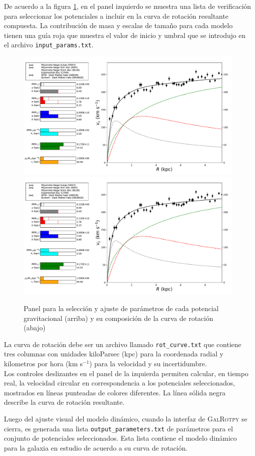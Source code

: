 De acuerdo a la figura \ref{fig:GUI1}, en el panel izquierdo se muestra una lista de verificación para seleccionar los potenciales a incluir en la curva de rotación resultante compuesta. La contribución de masa y escalas de tamaño para cada modelo tienen una guía roja que muestra el valor de inicio y umbral que se introdujo en  el archivo \verb+input_params.txt+.

\begin{figure}
  \centering
    \includegraphics[trim=0cm 0cm 22cm 0cm,clip=true, width=0.4\columnwidth]{Kap2/curve_RotPy.pdf}
    \includegraphics[trim=10.5cm 0cm 0cm 0cm,clip=true, width=0.6\columnwidth]{Kap2/curve_RotPy.pdf}
  \caption{ Panel para la selección y ajuste de parámetros de cada potencial gravitacional (arriba) y su composición de la curva de rotación (abajo)}
  \label{fig:GUI1}
\end{figure}

La curva de rotación debe ser un archivo llamado \verb+rot_curve.txt+ que contiene tres columnas con unidades kiloParsec (kpc) para la coordenada radial y kilometros por hora (km  s$^{-1}$) para la velocidad y su incertidumbre.\\

Los controles deslizantes en el panel de la izquierda permiten calcular, en tiempo real, la velocidad circular en correspondencia a los potenciales seleccionados, mostrados en líneas punteadas de colores diferentes. La línea sólida negra describe la curva de rotación resultante. 

Luego del ajuste visual del modelo dinámico, cuando la interfaz de \textsc{GalRotpy} se cierra, es generada una lista \verb+output_parameters.txt+ de parámetros para el conjunto de potenciales seleccionados. Esta lista contiene el modelo dinámico para la galaxia en estudio de acuerdo a su curva de rotación.\\

